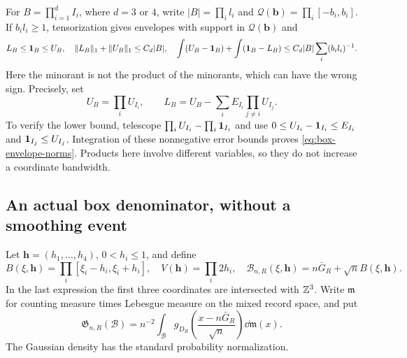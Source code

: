 For $B=\prod_{i=1}^d I_i$, where $d=3$ or $4$, write
$|B|=\prod_i l_i$ and $\mathcal Q(\mathbf b)=\prod_i[-b_i,b_i]$.
If $b_il_i\ge1$, tensorization gives envelopes with support in
$\mathcal Q(\mathbf b)$ and
\begin{equation}\label{eq:box-envelope-norms}
 L_B\le\one_B\le U_B,\quad
 \|L_B\|_1+\|U_B\|_1\le C_d|B|,\quad
 \int(U_B-\one_B)+\int(\one_B-L_B)
               \le C_d|B|\sum_i(b_il_i)^{-1}.
\end{equation}
Here the minorant is not the product of the minorants, which can
have the wrong sign. Precisely, set
\begin{equation}\label{eq:box-lower-envelope}
 U_B=\prod_i U_{I_i},\qquad
 L_B=U_B-\sum_i E_{I_i}\prod_{j\ne i}U_{I_j}.
\end{equation}
To verify the lower bound, telescope
$\prod_i U_{I_i}-\prod_i\mathbf1_{I_i}$ and use
$0\le U_{I_i}-\mathbf1_{I_i}\le E_{I_i}$ and $\mathbf1_{I_j}\le U_{I_j}$.
Integration of these nonnegative error bounds proves
\eqref{eq:box-envelope-norms}. Products here involve different variables,
so they do not increase a coordinate bandwidth.

\subsection{An actual box denominator, without a smoothing event}
Let $\mathbf h=(h_1,\ldots,h_4)$, $0<h_i\le1$, and define
\begin{equation}\label{eq:physical-window-box}
 B(\xi,\mathbf h)=\prod_i[\xi_i-h_i,\xi_i+h_i],\quad
 V(\mathbf h)=\prod_i2h_i,\quad
 \mathcal B_{n,R}(\xi,\mathbf h)=n\bar G_R+\sqrt n B(\xi,\mathbf h).
\end{equation}
In the last expression the first three coordinates are intersected
with $\mathbb Z^3$. Write $\mathfrak m$ for counting measure times Lebesgue
measure on the mixed record space, and put
\begin{equation}\label{eq:window-mixed-Gaussian}
 \mathfrak G_{n,R}(\mathcal B)=n^{-2}\int_{\mathcal B}
       g_{D_R}\left(\frac{x-n\bar G_R}{\sqrt n}\right)\dd\mathfrak m(x).
\end{equation}
The Gaussian density has the standard probability normalization.

